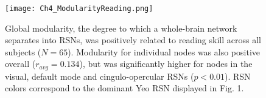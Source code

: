 \begin{figure}[h!]
\centering
\texttt{[image: Ch4\_ModularityReading.png]}
\caption[Modularity metrics at rest predict reading skill.] {Global modularity, the degree to which a whole-brain network separates into RSNs, was positively related to reading skill across all subjects ($N = 65$). Modularity for individual nodes was also positive overall ($r_{avg} = 0.134$), but was significantly higher for nodes in the visual, default mode and cingulo-opercular RSNs ($p < 0.01$). RSN colors correspond to the dominant Yeo RSN displayed in Fig. 1.}
\label{fig:texlogo}
\end{figure}


